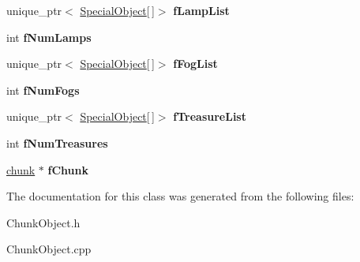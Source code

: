 \begin{DoxyCompactItemize}
\item 
\hypertarget{classChunkObject_aae87a2cac0d2d4a4516ea581e140fd1c}{unique\-\_\-ptr$<$ \hyperlink{structChunkObject_1_1SpecialObject}{\-Special\-Object}\mbox{[}$\,$\mbox{]}$>$ {\bfseries f\-Lamp\-List}}\label{classChunkObject_aae87a2cac0d2d4a4516ea581e140fd1c}

\item 
\hypertarget{classChunkObject_a2806cfb86ec247403262314269621c03}{int {\bfseries f\-Num\-Lamps}}\label{classChunkObject_a2806cfb86ec247403262314269621c03}

\item 
\hypertarget{classChunkObject_a990fae3ceabdfe55878ee82286c40d01}{unique\-\_\-ptr$<$ \hyperlink{structChunkObject_1_1SpecialObject}{\-Special\-Object}\mbox{[}$\,$\mbox{]}$>$ {\bfseries f\-Fog\-List}}\label{classChunkObject_a990fae3ceabdfe55878ee82286c40d01}

\item 
\hypertarget{classChunkObject_aac98326a70f3497c4422e9b7b6a918cb}{int {\bfseries f\-Num\-Fogs}}\label{classChunkObject_aac98326a70f3497c4422e9b7b6a918cb}

\item 
\hypertarget{classChunkObject_a6a76f5738ea7909c576655d305dba06d}{unique\-\_\-ptr$<$ \hyperlink{structChunkObject_1_1SpecialObject}{\-Special\-Object}\mbox{[}$\,$\mbox{]}$>$ {\bfseries f\-Treasure\-List}}\label{classChunkObject_a6a76f5738ea7909c576655d305dba06d}

\item 
\hypertarget{classChunkObject_ac2b3122a72b76727bba203df409ded26}{int {\bfseries f\-Num\-Treasures}}\label{classChunkObject_ac2b3122a72b76727bba203df409ded26}

\item 
\hypertarget{classChunkObject_a50b121bbbc1fca55d5f6e26215857106}{\hyperlink{structchunk}{chunk} $\ast$ {\bfseries f\-Chunk}}\label{classChunkObject_a50b121bbbc1fca55d5f6e26215857106}

\end{DoxyCompactItemize}


\-The documentation for this class was generated from the following files\-:\begin{DoxyCompactItemize}
\item 
\-Chunk\-Object.\-h\item 
\-Chunk\-Object.\-cpp\end{DoxyCompactItemize}
